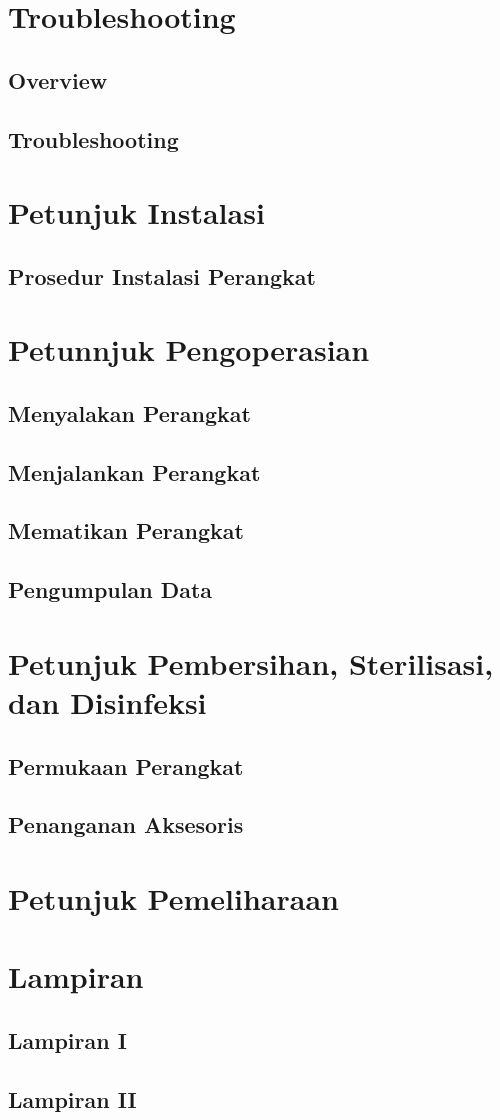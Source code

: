 \documentclass[11pt,a4paper,twoside,draft,onecolumn]{book}
\begin{document}
	\chapter{Troubleshooting}
		\section{Overview}
		\section{Troubleshooting}
	\newpage
	
	\chapter{Petunjuk Instalasi}
		\section{Prosedur Instalasi Perangkat}
	\newpage
	
	\chapter{Petunnjuk Pengoperasian}
		\section{Menyalakan Perangkat}
		\section{Menjalankan Perangkat}
		\section{Mematikan Perangkat}
		\section{Pengumpulan Data}
	\newpage
	
	\chapter{Petunjuk Pembersihan, Sterilisasi, dan Disinfeksi}
		\section{Permukaan Perangkat}
		\section{Penanganan Aksesoris}
	\newpage
	
	\chapter{Petunjuk Pemeliharaan}
	\newpage
	
	\chapter{Lampiran}
		\section{Lampiran I}
		\section{Lampiran II}
	\newpage
	
	
	
\end{document}
